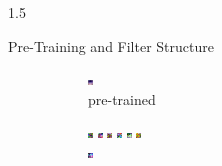 \documentclass[final]{beamer}
\newlength{\onecolwid}
\begin{document}
\begin{frame}[t]
\begin{columns}[t]
\begin{column}{1.5\onecolwid}
\begin{alertblock}{Pre-Training and Filter Structure}
\begin{figure}
\begin{subfigure}{.4\linewidth}
					\includegraphics[width=0.1\linewidth]{graphics/cifar_filters/pre_trained_18.png}
					\caption{pre-trained}
				\end{subfigure}
				\begin{subfigure}{.4\linewidth}
					\centering
					\includegraphics[width=0.1\linewidth]{graphics/cifar_filters/random_01.png} 
					\includegraphics[width=0.1\linewidth]{graphics/cifar_filters/random_02.png} %
					\includegraphics[width=0.1\linewidth]{graphics/cifar_filters/random_03.png}
					\includegraphics[width=0.1\linewidth]{graphics/cifar_filters/random_04.png} %
					\includegraphics[width=0.1\linewidth]{graphics/cifar_filters/random_05.png} %
					\includegraphics[width=0.1\linewidth]{graphics/cifar_filters/random_06.png} \\
					\includegraphics[width=0.1\linewidth]{graphics/cifar_filters/random_07.png} %

\end{subfigure}
\end{figure}
\end{alertblock}
\end{column}
\end{columns}
\end{frame}
\end{document}

